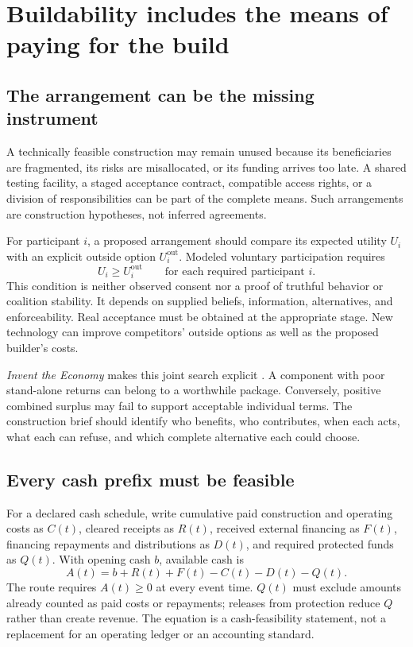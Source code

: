 \section{Buildability includes the means of paying for the build}
\label{sec:economy}

\subsection{The arrangement can be the missing instrument}

A technically feasible construction may remain unused because its beneficiaries are fragmented, its risks are misallocated, or its funding arrives too late. A shared testing facility, a staged acceptance contract, compatible access rights, or a division of responsibilities can be part of the complete means. Such arrangements are construction hypotheses, not inferred agreements.

For participant $i$, a proposed arrangement should compare its expected utility $U_i$ with an explicit outside option $U_i^{\mathrm{out}}$. Modeled voluntary participation requires
\begin{equation}
U_i\ge U_i^{\mathrm{out}}\qquad\text{for each required participant }i.
\label{eq:participation}
\end{equation}
This condition is neither observed consent nor a proof of truthful behavior or coalition stability. It depends on supplied beliefs, information, alternatives, and enforceability. Real acceptance must be obtained at the appropriate stage. New technology can improve competitors' outside options as well as the proposed builder's costs.

\emph{Invent the Economy} makes this joint search explicit \citep{boucherEconomy}. A component with poor stand-alone returns can belong to a worthwhile package. Conversely, positive combined surplus may fail to support acceptable individual terms. The construction brief should identify who benefits, who contributes, when each acts, what each can refuse, and which complete alternative each could choose.

\subsection{Every cash prefix must be feasible}

For a declared cash schedule, write cumulative paid construction and operating costs as $C(t)$, cleared receipts as $R(t)$, received external financing as $F(t)$, financing repayments and distributions as $D(t)$, and required protected funds as $Q(t)$. With opening cash $b$, available cash is
\begin{equation}
A(t)=b+R(t)+F(t)-C(t)-D(t)-Q(t).
\label{eq:cash}
\end{equation}
The route requires $A(t)\ge0$ at every event time. $Q(t)$ must exclude amounts already counted as paid costs or repayments; releases from protection reduce $Q$ rather than create revenue. The equation is a cash-feasibility statement, not a replacement for an operating ledger or an accounting standard.

